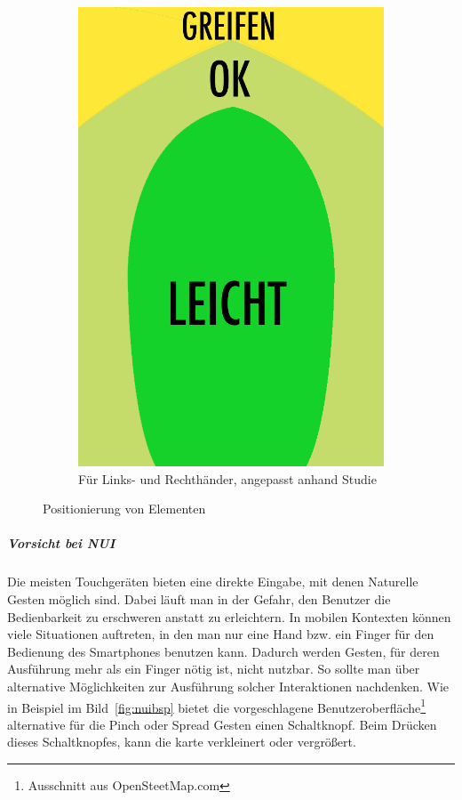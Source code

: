 \begin{figure}
\begin{subfigure}[b]{0.3\textwidth}
			\includegraphics[width=1\textwidth]{img/anordungDerElementeForAll.png}
			\caption{Für Links- und Rechthänder, angepasst anhand Studie \cite{Park:2010tu}}\label{fig:forallPositioning}
			
	\end{subfigure}
	\caption{Positionierung von Elementen}\label{fig:elementPos}
\end{figure}


\subparagraph{Vorsicht bei NUI} 
\label{subp:benutze_nui}

Die meisten Touchgeräten bieten eine direkte Eingabe, mit denen Naturelle Gesten möglich sind. Dabei läuft man in der Gefahr, den Benutzer die Bedienbarkeit zu erschweren anstatt zu erleichtern. In mobilen Kontexten können viele Situationen auftreten, in den man nur eine Hand bzw. ein Finger für den Bedienung des Smartphones benutzen kann. Dadurch werden Gesten, für deren Ausführung mehr als ein Finger nötig ist, nicht nutzbar. So sollte man über alternative Möglichkeiten zur Ausführung solcher Interaktionen nachdenken. Wie in Beispiel im Bild~\ref{fig:nuibsp} bietet die vorgeschlagene Benutzeroberfläche\footnote{Ausschnitt aus OpenSteetMap.com} alternative für die Pinch oder Spread Gesten einen Schaltknopf. Beim Drücken dieses Schaltknopfes, kann die karte verkleinert oder vergrößert. 

